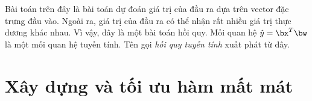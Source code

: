
Bài toán trên đây là bài toán dự đoán giá trị của đầu ra dựa trên vector đặc
trưng đầu vào. Ngoài ra, giá trị của đầu ra có thể nhận rất nhiều giá trị thực
dương khác nhau. Vì vậy, đây là một bài toán hồi quy. Mối quan hệ $\hat{y} =
\bx^T\bw$ là một mối quan hệ tuyến tính. Tên gọi \textit{hồi quy tuyến tính}
xuất phát từ đây.







\section{Xây dựng và tối ưu hàm mất mát}


